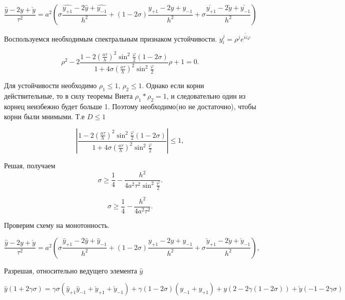 \documentclass{article}
\begin{document}
\begin{enumerate}
	
		$$\frac{\hat{y}-2y+\check{y}}{\tau^2}=a^2\left(\sigma \frac{\hat{y_{+1}}-2\hat{y}+\hat{y_{-1}}}{h^2}+(1-2\sigma)\frac{y_{+1}-2y+y_{-1}}{h^2}+\sigma \frac{\check{y_{+1}}-2\check{y}+\check{y_{-1}}}{h^2}\right)$$
		
		
		Воспользуемся необходимым спектральным признаком устойчивости. $y^j_i=\rho^j e^{i \tilde{i}\varphi}$



		\[
		\rho^2 - 2 \frac{1 - 2 \left( \frac{a\tau}{h} \right)^2 \sin^2 \frac{\varphi}{2} (1 - 2\sigma)}{1 + 4\sigma \left( \frac{a\tau}{h} \right)^2 \sin^2 \frac{\varphi}{2}} \rho + 1 = 0.
		\]
		
		Для устойчивости необходимо $\rho_1 \le 1, \, \rho_2 \le 1$. Однако если корни действительные, то в силу теоремы Виета $\rho_1 * \rho_2 = 1$, и следовательно один из корнец неизбежно будет больше 1. Поэтому необходимо(но не достаточно), чтобы корни были мнимыми. Т.е $D \leq 1$
		
		\[
		\left| \frac{1 - 2 \left( \frac{a\tau}{h} \right)^2 \sin^2 \frac{\varphi}{2} (1 - 2\sigma)}{1 + 4\sigma \left( \frac{a\tau}{h} \right)^2 \sin^2 \frac{\varphi}{2}} \right| \leq 1,
		\]
		
		Решая, получаем
		\[
		\sigma \geq \frac{1}{4} - \frac{h^2}{4a^2 \tau^2 \sin^2 \frac{\varphi}{2}}.
		\]
		

		\[
		\sigma \geq \frac{1}{4} - \frac{h^2}{4a^2 \tau^2}.
		\]
		
	
		Проверим схему на монотонность.
		
		\[
		\frac{\hat{y} - 2y + \check{y}}{\tau^2} = a^2 \left( \sigma \frac{\hat{y}_{+1} - 2\hat{y} + \hat{y}_{-1}}{h^2} + (1 - 2\sigma) \frac{y_{+1} - 2y + y_{-1}}{h^2} + \sigma \frac{\check{y}_{+1} - 2\check{y} + \check{y}_{-1}}{h^2} \right),
		\]
		
		
		Разрешая, относительно ведущего элемента $\hat{y}$
		
		
		
		\[
		\hat{y}(1+2\gamma \sigma) = \gamma \sigma(\hat{y}_{+1}\hat{y}_{-1}+\check{y}_{+1} + \check{y}_{-1}) + \gamma (1-2\sigma) (y_{-1} + y_{+1}) + y(2- 2\gamma(1-2\sigma)) + \check{y} (-1-2\gamma \sigma)
		\]
		

\end{enumerate}
\end{document}
